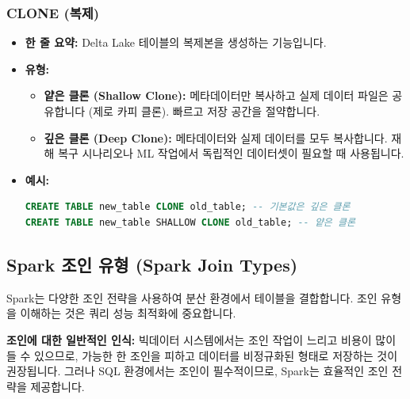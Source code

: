 \documentclass[11pt,a4paper]{article}
\theoremstyle{definition}
\begin{document}
\subsubsection{CLONE (복제)}
\begin{itemize}
    \item \textbf{한 줄 요약:} Delta Lake 테이블의 복제본을 생성하는 기능입니다.
    \item \textbf{유형:}
    \begin{itemize}
        \item \textbf{얕은 클론 (Shallow Clone):} 메타데이터만 복사하고 실제 데이터 파일은 공유합니다 (제로 카피 클론). 빠르고 저장 공간을 절약합니다.
        \item \textbf{깊은 클론 (Deep Clone):} 메타데이터와 실제 데이터를 모두 복사합니다. 재해 복구 시나리오나 ML 작업에서 독립적인 데이터셋이 필요할 때 사용됩니다.
    \end{itemize}
    \item \textbf{예시:}
    \begin{lstlisting}[language=SQL, caption=Delta Lake 클론 예시, label=lst:delta_clone]
CREATE TABLE new_table CLONE old_table; -- 기본값은 깊은 클론
CREATE TABLE new_table SHALLOW CLONE old_table; -- 얕은 클론
\end{lstlisting}
\end{itemize}

\subsection{Spark 조인 유형 (Spark Join Types)}
Spark는 다양한 조인 전략을 사용하여 분산 환경에서 테이블을 결합합니다. 조인 유형을 이해하는 것은 쿼리 성능 최적화에 중요합니다.

\begin{warningbox}
\textbf{조인에 대한 일반적인 인식:}
빅데이터 시스템에서는 조인 작업이 느리고 비용이 많이 들 수 있으므로, 가능한 한 조인을 피하고 데이터를 비정규화된 형태로 저장하는 것이 권장됩니다. 그러나 SQL 환경에서는 조인이 필수적이므로, Spark는 효율적인 조인 전략을 제공합니다.
\end{warningbox}
\end{document}
